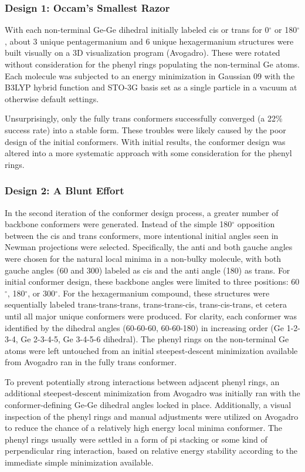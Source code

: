 \subsubsection{Design 1: Occam's Smallest Razor}

With each non-terminal Ge-Ge dihedral initially labeled cis or trans for 0$^{\circ}$ or 180$^{\circ}$, about 3 unique pentagermanium and 6 unique hexagermanium structures were built visually on a 3D visualization program (Avogadro).
These were rotated without consideration for the phenyl rings populating the non-terminal Ge atoms.
Each molecule was subjected to an energy minimization in Gaussian 09 with the B3LYP hybrid function and STO-3G basis set as a single particle in a vacuum at otherwise default settings. 

Unsurprisingly, only the fully trans conformers successfully converged (a 22\% success rate) into a stable form. 
These troubles were likely caused by the poor design of the initial conformers. 
With initial results, the conformer design was altered into a more systematic approach with some consideration for the phenyl rings.

\subsubsection{Design 2: A Blunt Effort}

In the second iteration of the conformer design process, a greater number of backbone conformers were generated. 
Instead of the simple 180$^{\circ}$ opposition between the cis and trans conformers, more intentional initial angles seen in Newman projections were selected.
Specifically, the anti and both gauche angles were chosen for the natural local minima in a non-bulky molecule, with both gauche angles (60 and 300) labeled as cis and the anti angle (180) as trans. 
For initial conformer design, these backbone angles were limited to three positions: 60$^{\circ}$, 180$^{\circ}$, or 300$^{\circ}$.
For the hexagermanium compound, these structures were sequentially labeled trans-trans-trans, trans-trans-cis, trans-cis-trans, et cetera until all major unique conformers were produced.
For clarity, each conformer was identified by the dihedral angles (60-60-60, 60-60-180) in increasing order (Ge 1-2-3-4, Ge 2-3-4-5, Ge 3-4-5-6 dihedral).
The phenyl rings on the non-terminal Ge atoms were left untouched from an initial steepest-descent minimization available from Avogadro ran in the fully trans conformer.

To prevent potentially strong interactions between adjacent phenyl rings, an additional steepest-descent minimization from Avogadro was initially ran with the conformer-defining Ge-Ge dihedral angles locked in place. 
Additionally, a visual inspection of the phenyl rings and manual adjustments were utilized on Avogadro to reduce the chance of a relatively high energy local minima conformer. 
The phenyl rings usually were settled in a form of pi stacking or some kind of perpendicular ring interaction, based on relative energy stability according to the immediate simple minimization available. 


